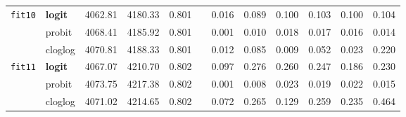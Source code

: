 \begin{tabular}{clcccccccccc}
\texttt{fit10}  & \textbf{logit}     & 4062.81   & 4180.33   & 0.801   &   & 0.016   & 0.089   & 0.100   & 0.103   & 0.100   & 0.104   \\
       & probit             & 4068.41   & 4185.92   & 0.801   &   & 0.001   & 0.010   & 0.018   & 0.017   & 0.016   & 0.014   \\
       & cloglog            & 4070.81   & 4188.33   & 0.801   &   & 0.012   & 0.085   & 0.009   & 0.052   & 0.023   & 0.220   \\
\texttt{fit11}  & \textbf{logit}     & 4067.07   & 4210.70   & 0.802   &   & 0.097   & 0.276   & 0.260   & 0.247   & 0.186   & 0.230   \\
       & probit             & 4073.75   & 4217.38   & 0.802   &   & 0.001   & 0.008   & 0.023   & 0.019   & 0.022   & 0.015   \\
       & cloglog            & 4071.02   & 4214.65   & 0.802   &   & 0.072   & 0.265   & 0.129   & 0.259   & 0.235   & 0.464   \\
\bottomrule
\end{tabular}